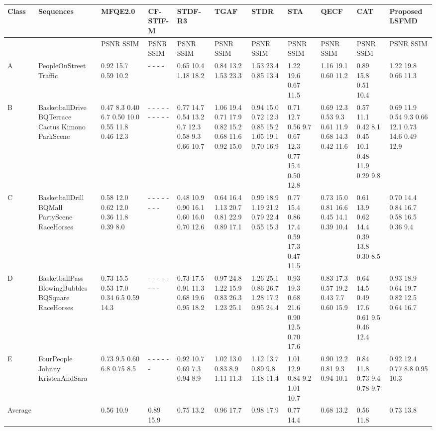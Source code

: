 \begin{tabular}{lllllllllll}
\toprule
Class & Sequences & MFQE2.0 & CF-STIF-M & STDF-R3 & TGAF & STDR & STA & QECF & CAT & Proposed LSFMD \\
\midrule
 &  & PSNR SSIM & PSNR SSIM & PSNR SSIM & PSNR SSIM & PSNR SSIM & PSNR SSIM & PSNR SSIM & PSNR SSIM & PSNR SSIM \\
A & PeopleOnStreet Traffic & 0.92 15.7 0.59 10.2 & - - - - & 0.65 10.4 1.18 18.2 & 0.84 13.2 1.53 23.3 & 1.53 23.4 0.85 13.4 & 1.22 19.6 0.67 11.5 & 1.16 19.1 0.60 11.2 & 0.89 15.8 0.51 10.4 & 1.22 19.8 0.66 11.3 \\
B & BasketballDrive BQTerrace Cactus Kimono ParkScene & 0.47 8.3 0.40 6.7 0.50 10.0 0.55 11.8 0.46 12.3 & - - - - - - - - - - & 0.77 14.7 0.54 13.2 0.7 12.3 0.58 9.3 0.66 10.7 & 1.06 19.4 0.71 17.9 0.82 15.2 0.68 11.6 0.92 15.0 & 0.94 15.0 0.72 12.3 0.85 15.2 1.05 19.1 0.70 16.9 & 0.71 12.7 0.56 9.7 0.67 12.3 0.77 15.4 0.50 12.8 & 0.69 12.3 0.53 9.3 0.61 11.9 0.68 14.3 0.42 11.6 & 0.57 11.1 0.42 8.1 0.45 10.1 0.48 11.9 0.29 9.8 & 0.69 11.9 0.54 9.3 0.66 12.1 0.73 14.6 0.49 12.9 \\
C & BasketballDrill BQMall PartyScene RaceHorses & 0.58 12.0 0.62 12.0 0.36 11.8 0.39 8.0 & - - - - - - - - & 0.48 10.9 0.90 16.1 0.60 16.0 0.70 12.6 & 0.64 16.4 1.13 20.7 0.81 22.9 0.89 17.1 & 0.99 18.9 1.19 21.2 0.79 22.4 0.55 15.3 & 0.77 15.4 0.86 17.4 0.59 17.3 0.47 11.5 & 0.73 15.0 0.81 16.6 0.45 14.1 0.39 10.4 & 0.61 13.9 0.62 14.4 0.39 13.8 0.30 8.5 & 0.70 14.4 0.84 16.7 0.58 16.5 0.36 9.4 \\
D & BasketballPass BlowingBubbles BQSquare RaceHorses & 0.73 15.5 0.53 17.0 0.34 6.5 0.59 14.3 & - - - - - - - - & 0.73 17.5 0.91 11.3 0.68 19.6 0.95 18.2 & 0.97 24.8 1.22 15.9 0.83 26.3 1.23 25.1 & 1.26 25.1 0.86 26.7 1.28 17.2 0.95 24.4 & 0.93 19.3 0.68 21.6 0.90 12.5 0.70 17.6 & 0.83 17.3 0.57 19.2 0.43 7.7 0.60 15.9 & 0.64 14.5 0.49 17.6 0.61 9.5 0.46 12.4 & 0.93 18.9 0.64 19.7 0.82 12.5 0.64 16.7 \\
E & FourPeople Johnny KristenAndSara & 0.73 9.5 0.60 6.8 0.75 8.5 & - - - - - - & 0.92 10.7 0.69 7.3 0.94 8.9 & 1.02 13.0 0.83 8.9 1.11 11.3 & 1.12 13.7 0.89 9.8 1.18 11.4 & 1.01 12.9 0.84 9.2 1.01 10.7 & 0.90 12.2 0.81 9.3 0.94 10.1 & 0.84 11.8 0.73 9.4 0.78 9.7 & 0.92 12.4 0.77 8.8 0.95 10.3 \\
Average &  & 0.56 10.9 & 0.89 15.9 & 0.75 13.2 & 0.96 17.7 & 0.98 17.9 & 0.77 14.4 & 0.68 13.2 & 0.56 11.8 & 0.73 13.8 \\
\bottomrule
\end{tabular}
